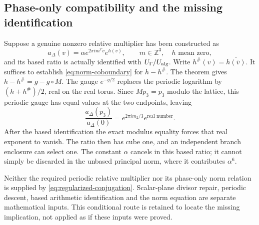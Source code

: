 \subsection{Phase-only compatibility and the missing identification}
Suppose a genuine nonzero relative multiplier has been constructed as
\[
 a_\Delta(v)=\alpha e^{2\pi im^Tv}e^{h(v)},\qquad
 m\in\mathbb Z^3,\quad h\text{ mean zero},
\]
and its based ratio is actually identified with $U_\Gamma/U_{\rm alg}$. Write $h^\#(v)=\overline{h(\overline v)}$. It suffices to establish \eqref{eq:norm-coboundary} for $h-h^\#$. The theorem gives $h-h^\#=g-g\circ M$. The gauge $e^{-g/2}$ replaces the periodic logarithm by $(h+h^\#)/2$, real on the real torus. Since $Mp_3=p_3$ modulo the lattice, this periodic gauge has equal values at the two endpoints, leaving
\[
 \frac{a_\Delta(p_3)}{a_\Delta(0)}=e^{2\pi im_2/3}e^{\text{real number}}.
\]
After the based identification the exact modulus equality forces that real exponent to vanish. The ratio then has cube one, and an independent branch enclosure can select one. The constant $\alpha$ cancels in this based ratio; it cannot simply be discarded in the unbased principal norm, where it contributes $\alpha^6$.

Neither the required periodic relative multiplier nor its phase-only norm relation is supplied by \eqref{eq:regularized-conjugation}. Scalar-plane divisor repair, periodic descent, based arithmetic identification and the norm equation are separate mathematical inputs. This conditional route is retained to locate the missing implication, not applied as if these inputs were proved.
